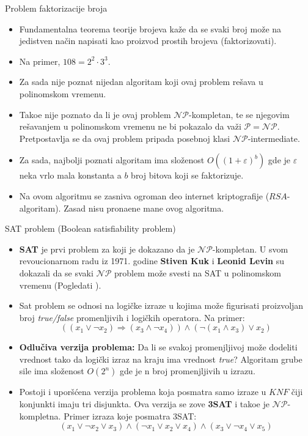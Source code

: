 \documentclass[aspectratio=169, xcolor=table, 10pt]{beamer}
\theoremstyle{definition}
\begin{document}
\begin{frame}{Problem faktorizacije broja}
    \begin{itemize}
        \item Fundamentalna teorema teorije brojeva ka\v ze da se svaki broj mo\v ze na jedistven na\v cin napisati kao proizvod prostih brojeva (faktorizovati).
        \item Na primer, $108 = 2^2 \cdot 3^3$.
        \item Za sada nije poznat nijedan algoritam koji ovaj problem re\v sava u polinomskom vremenu.
        \item Tako\dj e nije poznato da li je ovaj problem $\mathcal{NP}$-kompletan, te se njegovim re\v savanjem u polinomskom vremenu ne bi pokazalo da va\v zi $\mathcal{P} = \mathcal{NP}$. Pretpostavlja se da ovaj problem pripada posebnoj klasi $\mathcal{NP}$-intermediate.
        \item Za sada, najbolji poznati algoritam ima slo\v zenost $O\left( \left(1 + \varepsilon \right)^b\right)$ gde je $\varepsilon$ neka vrlo mala konstanta a $b$ broj bitova koji se faktorizuje.
        \item Na ovom algoritmu se zasniva ogroman deo internet kriptografije ($RSA$-algoritam). Zasad nisu prona\dj ene mane ovog algoritma.
    \end{itemize}
\end{frame}

\begin{frame}{SAT problem (Boolean satisfiability problem) }
    \begin{itemize}
        \item \textbf{SAT} je prvi problem za koji je dokazano da je $\mathcal{NP}$-kompletan. U svom revoucionarnom radu iz 1971. godine \textbf{Stiven Kuk} i \textbf{Leonid Levin} su dokazali da se svaki $\mathcal{NP}$ problem mo\v ze svesti na SAT u polinomskom vremenu (Pogledati \cite{cook}). 
        \item Sat problem se odnosi na logi\v cke izraze u kojima mo\v ze figurisati proizvoljan broj \emph{true/false} promenljivih i logi\v ckih operatora. Na primer:
        $$\left( (x_1 \lor \neg x_2) \Rightarrow (x_3 \land \neg x_4) \right) \land \left( \neg (x_1 \land x_3) \lor x_2 \right)$$
        
        \item \textbf{Odlu\v civa verzija problema:} Da li se svakoj promenjljivoj mo\v ze dodeliti vrednost tako da logi\v cki izraz na kraju ima vrednost \emph{true}? Algoritam grube sile ima slo\v zenost $O(2^n)$ gde je n broj promenjljivih u izrazu.
        \item Postoji i upor\v s\' cena verzija problema koja posmatra samo izraze u $KNF$ \v ciji konjunkti imaju tri disjunkta. Ova verzija se zove \textbf{3SAT} i tako\dj e je $\mathcal{NP}$-kompletna. Primer izraza koje posmatra 3SAT:
        $$(x_1 \lor \neg x_2 \lor x_3) \land (\neg x_1 \lor x_2 \lor x_4) \land (x_3 \lor \neg x_4 \lor x_5)$$
    \end{itemize}
\end{frame}
\end{document}
